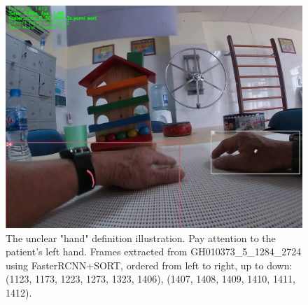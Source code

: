 \begin{figure}[ht!]
	\includegraphics[width=.16\textwidth]{Figs/definition/1412.png}
	\caption{The unclear "hand" definition illustration. Pay attention to the patient's left hand. Frames extracted from GH010373\_5\_1284\_2724 using FasterRCNN+SORT, ordered from left to right, up to down: (1123, 1173, 1223, 1273, 1323, 1406), (1407, 1408, 1409, 1410, 1411, 1412).}
	\label{fig:definition}
\end{figure}